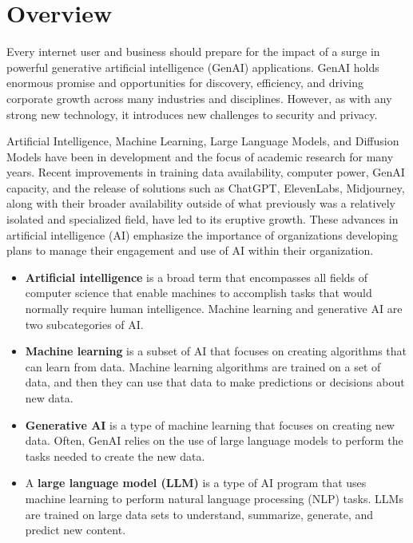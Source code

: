 

\headerimage
\chapter{Overview}

Every internet user and business should prepare for the impact of a surge in
powerful generative artificial intelligence (GenAI) applications. GenAI holds
enormous promise and opportunities for discovery, efficiency, and driving
corporate growth across many industries and disciplines. However, as with any
strong new technology, it introduces new challenges to security and privacy.

Artificial Intelligence, Machine Learning, Large Language Models, and Diffusion
Models have been in development and the focus of academic research for many
years. Recent improvements in training data availability, computer power,
GenAI capacity, and the release of solutions such as ChatGPT, ElevenLabs,
Midjourney, along with their broader availability outside of what previously
was a relatively isolated and specialized field, have led to its eruptive
growth. These advances in artificial intelligence (AI) emphasize the importance
of organizations developing plans to manage their engagement and use of AI
within their organization.

\begin{itemize}
  \item \textbf{Artificial intelligence} is a broad term that encompasses all fields of
  computer science that enable machines to accomplish tasks that would normally
  require human intelligence. Machine learning and generative AI are two
  subcategories of AI.
  \item \textbf{Machine learning} is a subset of AI that focuses on creating algorithms
  that can learn from data. Machine learning algorithms are trained on a set of
  data, and then they can use that data to make predictions or decisions about
  new data.
  \item \textbf{Generative AI} is a type of machine learning that focuses on creating
  new data. Often, GenAI relies on the use of large language models to perform
  the tasks needed to create the new data.
  \item A \textbf{large language model (LLM)} is a type of AI program that uses machine
  learning to perform natural language processing (NLP) tasks. LLMs are trained
  on large data sets to understand, summarize, generate, and predict new
  content.
\end{itemize}

